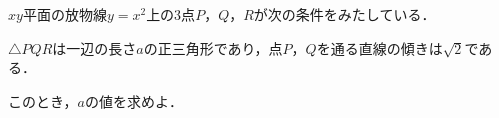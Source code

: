 \documentclass[../../main.tex]{subfiles}
\begin{document}
$xy$平面の放物線$y=x^2$上の3点$P$，$Q$，$R$が次の条件をみたしている．
\begin{center}
  $\triangle PQR$は一辺の長さ$a$の正三角形であり，点$P$，$Q$を通る直線の傾きは$\sqrt2$である．
\end{center}
このとき，$a$の値を求めよ．
\end{document}
